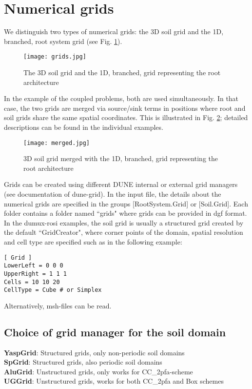 \chapter*{Numerical grids}
We distinguish two types of numerical grids: the 3D soil grid and the 1D, branched, root system grid (see Fig. \ref{fig:grids}). 

\begin{figure}[ht]
	\centering
  \texttt{[image: grids.jpg]}
	\caption{The 3D soil grid and the 1D, branched, grid representing the root architecture}
	\label{fig:grids}
\end{figure}

In the example of the coupled problems, both are used simultaneously. In that case, the two grids are merged via source/sink terms in positions where root and soil grids share the same spatial coordinates. This is illustrated in Fig. \ref{fig:merged}; detailed descriptions can be found in the individual examples. 
 
\begin{figure}[ht]
	\centering
  \texttt{[image: merged.jpg]}
	\caption{3D soil grid merged with the 1D, branched, grid representing the root architecture}
	\label{fig:merged}
\end{figure}

Grids can be created using different DUNE internal or external grid managers (see documentation of dune-grid). In the input file, the details about the numerical grids are specified in the groups [RootSystem.Grid] or [Soil.Grid]. Each folder contains a folder named ``grids" where grids can be provided in dgf format. In the dumux-rosi examples, the soil grid is usually a structured grid created by the default ``GridCreator", where corner points of the domain, spatial resolution and cell type are specified such as in the following example: 

\begin{lstlisting}
[ Grid ]
LowerLeft = 0 0 0
UpperRight = 1 1 1
Cells = 10 10 20
CellType = Cube # or Simplex
\end{lstlisting}

Alternatively, msh-files can be read. 

\section*{Choice of grid manager for the soil domain}

\textbf{YaspGrid}: Structured grids, only non-periodic soil domains\\
\textbf{SpGrid}: Structured grids, also periodic soil domains\\
\textbf{AluGrid}: Unstructured grids, only works for CC_2pfa-scheme\\
\textbf{UGGrid}: Unstructured grids, works for both CC_2pfa and Box schemes\\

